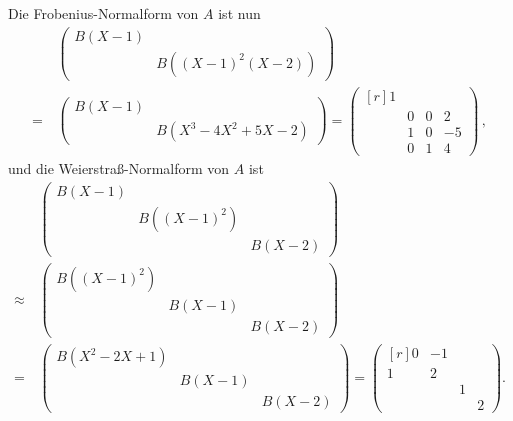Die Frobenius-Normalform von $A$ ist nun
\begin{align*}
   &\,  \begin{pmatrix}
          B(X-1)  &                               \\
                  & B\left( (X-1)^2 (X-2) \right)
        \end{pmatrix}
  \\
  =&\,  \begin{pmatrix}
          B(X-1)  &                                     \\
                  & B\left( X^3 - 4X^2 + 5X - 2 \right)
        \end{pmatrix}
  =     \begin{pmatrix*}[r]
          1 &   &   &     \\
            & 0 & 0 &  2  \\
            & 1 & 0 & -5  \\
            & 0 & 1 &  4
        \end{pmatrix*} \,,
\end{align*}
und die Weierstraß-Normalform von $A$ ist
\begin{align*}
        &\,   \begin{pmatrix}
                B(X-1)  &                         &         \\
                        & B\left( (X-1)^2 \right) &         \\
                        &                         & B(X-2)
              \end{pmatrix}
  \\
  \approx&\,  \begin{pmatrix}
                B\left( (X-1)^2 \right) &         &         \\
                                        & B(X-1)  &         \\
                                        &         & B(X-2)
              \end{pmatrix}
  \\
  =&\,        \begin{pmatrix}
                B\left( X^2 - 2X + 1 \right)  &         &         \\
                                              & B(X-1)  &         \\
                                              &         & B(X-2)
              \end{pmatrix}
  =           \begin{pmatrix*}[r]
                0 & -1 &   &    \\
                1 &  2 &   &    \\
                  &    & 1 &    \\
                  &    &   & 2
              \end{pmatrix*}.
\end{align*}

